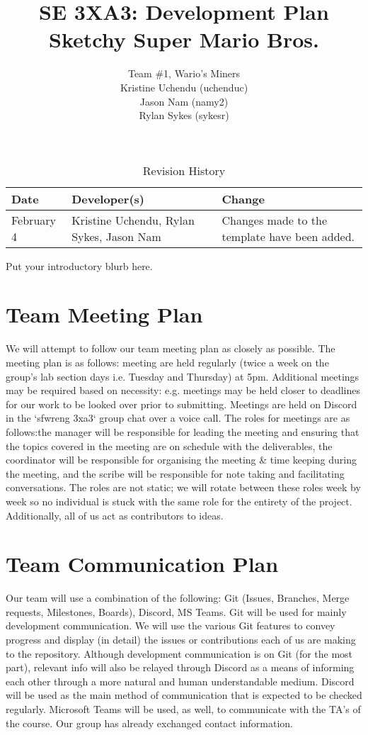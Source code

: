\documentclass{article}
\title{SE 3XA3: Development Plan\\Sketchy Super Mario Bros.}
\author{Team \#1, Wario's Miners
		\\ Kristine Uchendu (uchenduc)
		\\ Jason Nam (namy2)
		\\ Rylan Sykes (sykesr)
}
\date{}
\begin{document}
\begin{table}[hp]
\caption{Revision History} \label{TblRevisionHistory}
\begin{tabularx}{\textwidth}{llX}
\toprule
\textbf{Date} & \textbf{Developer(s)} & \textbf{Change}\\
\midrule
February 4 & Kristine Uchendu, Rylan Sykes, Jason Nam & Changes made to the template have been added.\\
\bottomrule
\end{tabularx}
\end{table}

\newpage

\maketitle

Put your introductory blurb here.

\section{Team Meeting Plan}

We will attempt to follow our team meeting plan as closely as possible. The meeting plan is as follows: meeting are held regularly (twice a week on the group’s lab section days i.e. Tuesday and Thursday) at 5pm. Additional meetings may be required based on necessity: e.g. meetings may be held closer to deadlines for our work to be looked over prior to submitting. Meetings are held on Discord in the `sfwreng 3xa3` group chat over a voice call. The roles for meetings are as follows:the manager will be responsible for leading the meeting and ensuring that the topics covered in the meeting are on schedule with the deliverables, the coordinator will be responsible for organising the meeting & time keeping during the meeting, and the scribe will be responsible for note taking and facilitating conversations. The roles are not static; we will rotate between these roles week by week so no individual is stuck with the same role for the entirety of the project. Additionally, all of us act as contributors to ideas.

\section{Team Communication Plan}

Our team will use a combination of the following: Git (Issues, Branches, Merge requests, Milestones, Boards), Discord, MS Teams. Git will be used for mainly development communication. We will use the various Git features to convey progress and display (in detail) the issues or contributions each of us are making to the repository. Although development communication is on Git (for the most part), relevant info will also be relayed through Discord as a means of informing each other through a more natural and human understandable medium. Discord will be used as the main method of communication that is expected to be checked regularly. Microsoft Teams will be used, as well, to communicate with the TA’s of the course. Our group has already exchanged contact information.
\end{document}
